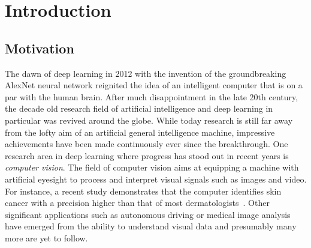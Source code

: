 \documentclass[a4paper,12pt]{report}
\begin{document}
\newpage
\tableofcontents
\newpage
%

\chapter{Introduction}
\section{Motivation}
The dawn of deep learning in 2012 with the invention of the groundbreaking AlexNet neural network reignited the idea of an intelligent computer that is on a par with the human brain. After much disappointment in the late 20th century, the decade old research field of artificial intelligence and deep learning in particular was revived around the globe. While today research is still far away from the lofty aim of an artificial general intelligence machine, impressive achievements have been made continuously ever since the breakthrough. One research area in deep learning where progress has stood out in recent years is \textit{computer vision}. The field of computer vision aims at equipping a machine with artificial eyesight to process and interpret visual signals such as images and video. For instance, a recent study demonstrates that the computer identifies skin cancer with a precision higher than that of most dermatologists~\cite{MelanomaCNN}. Other significant applications such as autonomous driving or medical image analysis have emerged from the ability to understand visual data and presumably many more are yet to follow. 
\end{document}
